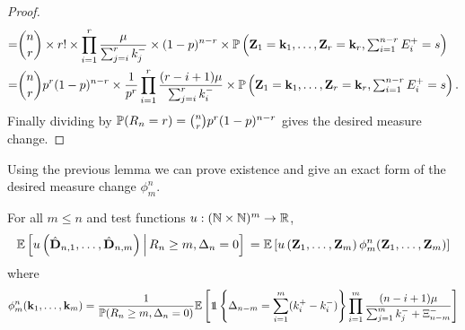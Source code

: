 \begin{proof}
\begin{align*}
        =& \binom{n}{r} \times r!
        \times \prod_{i=1}^r \frac{\mu}{\sum_{j=i}^r k_j^-} \times (1-p)^{n-r}
        \times \P\left(\vZ_1 = \vk_1, \ldots, \vZ_r = \vk_r, \textstyle \sum_{i=1}^{n-r} E_i^+ = s \right) \\
        =& \binom{n}{r} p^r (1-p)^{n-r} \times \frac{1}{p^r} \prod_{i=1}^r \frac{(r-i+1) \mu}{\sum_{j=i}^r k_i^-}
        \times \P\left(\vZ_1 = \vk_1, \ldots, \vZ_r = \vk_r, \textstyle \sum_{i=1}^{n-r} E_i^+ = s \right).
    \end{align*}
    Finally dividing by $\P(R_n = r) = \binom{n}{r} p^r (1-p)^{n-r}$ gives the desired measure change.
\end{proof}

Using the previous lemma we can prove existence and give an exact form of the desired measure change $\phi^n_m$.

\begin{lemma}
    \label{lem:exact-measure-change}
    For all $m \leq n$ and test functions $u: (\N \times \N)^m \to \R$,
    \begin{equation*}
        \E \left[
            u\left( \hat{\vD}_{n, 1}, \ldots, \hat{\vD}_{n, m} \right)
            \,\middle\vert\,
            R_n \geq m,
            \Delta_n = 0
        \right] \\
        =
        \E \left[
            u\left( \vZ_1, \ldots, \vZ_m \right)
            \phi^n_m(\vZ_1, \ldots, \vZ_m)
        \right]
    \end{equation*}
    where
    \begin{align*}
        \phi^n_m(\vk_1, \ldots, \vk_m) =
        \frac{1}{\P(R_n \geq m, \Delta_n = 0)} \E\left[ 
            \one \left\{ \Delta_{n-m} = \sum_{i=1}^m (k_i^+ - k_i^-) \right\}
            \prod_{i=1}^m \frac{(n - i + 1) \mu}{\sum_{j=1}^m k_j^- + \Xi_{n-m}^-}
        \right]
    \end{align*}
\end{lemma}


